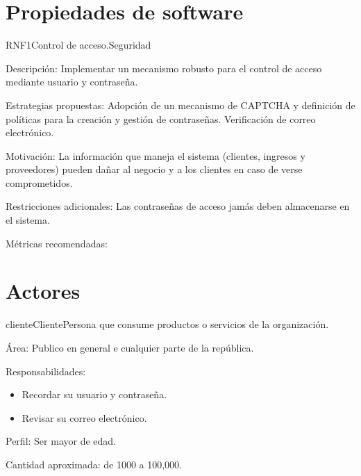 \documentclass[10pt]{book}
\begin{document}
\section{Propiedades de software}

%
\begin{cdtSoftwareProperty}[version=0.1, status=\cdtStEdition]
	{RNF1}{Control de acceso.}{Seguridad}
	\item[Descripción:] Implementar un mecanismo robusto para el control de acceso mediante usuario y contraseña.
	\item[Estrategias propuestas:] Adopción de un mecanismo de CAPTCHA y definición de políticas para la creación y gestión de contraseñas. Verificación de correo electrónico.
	\item[Motivación:] La información que maneja el sistema (clientes, ingresos y proveedores) pueden dañar al negocio y a los clientes en caso de verse comprometidos.
	\item[Restricciones adicionales:] Las contraseñas de acceso jamás deben almacenarse en el sistema.
	\item[Métricas recomendadas:] 
\end{cdtSoftwareProperty}

\section{Actores}

\begin{cdtActor}[version=0.1, status=\cdtStEdition]
	{cliente}{Cliente}{Persona que consume productos o servicios de la organización.}
	\item[Área:] Publico en general e cualquier parte de la república.
	\item[Responsabilidades:] \cdtEmpty 	
    \begin{itemize}
    	\item Recordar su usuario y contraseña.
		\item Revisar su correo electrónico.
    \end{itemize}
	\item[Perfil:] Ser mayor de edad.
 	\item[Cantidad aproximada:] de 1000 a 100,000.
\end{cdtActor}
\end{document}
